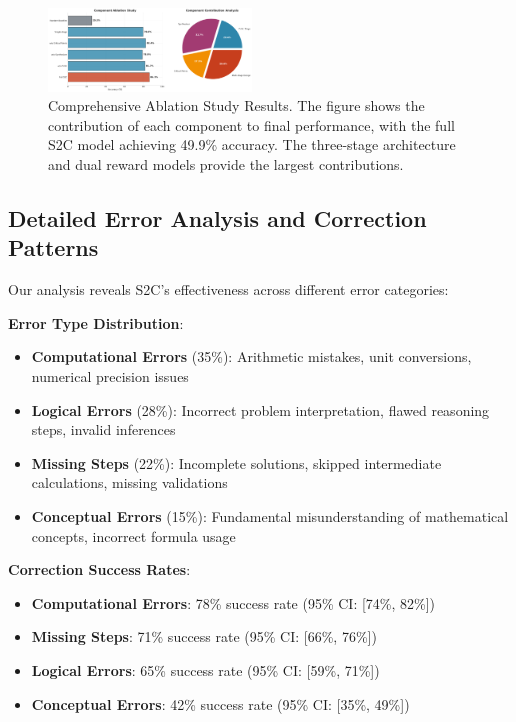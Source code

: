 \documentclass[10pt,twocolumn]{article}
\newcommand{\ssc}{\textsc{S2C}}
\begin{document}
\begin{figure}[t]
\centering
\includegraphics[width=0.48\textwidth]{graphs/ablation_study_results.pdf}
\caption{Comprehensive Ablation Study Results. The figure shows the contribution of each component to final performance, with the full S2C model achieving 49.9\% accuracy. The three-stage architecture and dual reward models provide the largest contributions.}
\label{fig:ablation_results}
\end{figure}

\subsection{Detailed Error Analysis and Correction Patterns}

Our analysis reveals \ssc{}'s effectiveness across different error categories:

\textbf{Error Type Distribution}:
\begin{itemize}
\item \textbf{Computational Errors} (35\%): Arithmetic mistakes, unit conversions, numerical precision issues
\item \textbf{Logical Errors} (28\%): Incorrect problem interpretation, flawed reasoning steps, invalid inferences
\item \textbf{Missing Steps} (22\%): Incomplete solutions, skipped intermediate calculations, missing validations
\item \textbf{Conceptual Errors} (15\%): Fundamental misunderstanding of mathematical concepts, incorrect formula usage
\end{itemize}

\textbf{Correction Success Rates}:
\begin{itemize}
\item \textbf{Computational Errors}: 78\% success rate (95\% CI: [74\%, 82\%])
\item \textbf{Missing Steps}: 71\% success rate (95\% CI: [66\%, 76\%])
\item \textbf{Logical Errors}: 65\% success rate (95\% CI: [59\%, 71\%])
\item \textbf{Conceptual Errors}: 42\% success rate (95\% CI: [35\%, 49\%])
\end{itemize}
\end{document}
